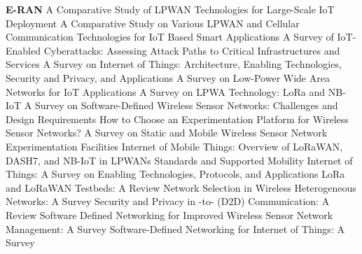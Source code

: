 \textbf{E-RAN} \newline  \cite{mekki_comparative_2019} A Comparative Study of {{LPWAN}} Technologies for Large-Scale {{IoT}} Deployment \newline 
 \cite{gaddam_comparative_2018} A {{Comparative Study}} on {{Various LPWAN}} and {{Cellular Communication Technologies}} for {{IoT Based Smart Applications}} \newline 
 \cite{stellios_survey_2018} A {{Survey}} of {{IoT}}-Enabled {{Cyberattacks}}: {{Assessing Attack Paths}} to {{Critical Infrastructures}} and {{Services}} \newline 
 \cite{lin_survey_2017} A {{Survey}} on {{Internet}} of {{Things}}: {{Architecture}}, {{Enabling Technologies}}, {{Security}} and {{Privacy}}, and {{Applications}} \newline 
 \cite{bembe_survey_2019} A Survey on Low-Power Wide Area Networks for {{IoT}} Applications \newline 
 \cite{sinha_survey_2017} A Survey on {{LPWA}} Technology: {{LoRa}} and {{NB}}-{{IoT}} \newline 
 \cite{kobo_survey_2017} A {{Survey}} on {{Software}}-{{Defined Wireless Sensor Networks}}: {{Challenges}} and {{Design Requirements}} \newline 
 \cite{tonneau_how_2015} How to Choose an Experimentation Platform for Wireless Sensor Networks? {{A}} Survey on Static and Mobile Wireless Sensor Network Experimentation Facilities \newline 
 \cite{ayoub_internet_2019} Internet of {{Mobile Things}}: {{Overview}} of {{LoRaWAN}}, {{DASH7}}, and {{NB}}-{{IoT}} in {{LPWANs Standards}} and {{Supported Mobility}} \newline 
 \cite{al-fuqaha_internet_2015} Internet of {{Things}}: {{A Survey}} on {{Enabling Technologies}}, {{Protocols}}, and {{Applications}} \newline 
 \cite{marais_lora_2017} {{LoRa}} and {{LoRaWAN}} Testbeds: {{A}} Review \newline 
 \cite{bendaoud_network_2019} Network {{Selection}} in {{Wireless Heterogeneous Networks}}: A {{Survey}} \newline 
 \cite{haus_security_2017} Security and {{Privacy}} in {{}}-to-{{}} ({{D2D}}) {{Communication}}: {{A Review}} \newline 
 \cite{ndiaye_software_2017} Software {{Defined Networking}} for {{Improved Wireless Sensor Network Management}}: {{A Survey}} \newline 
 \cite{bera_softwaredefined_2017} Software-{{Defined Networking}} for {{Internet}} of {{Things}}: {{A Survey}} \newline 
